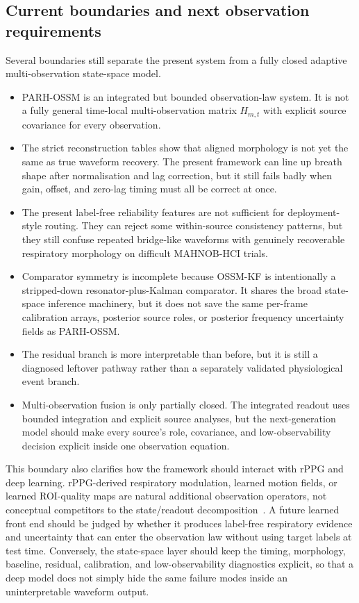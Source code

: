 \documentclass[fleqn,10pt]{wlscirep}
\begin{document}
\subsection*{Current boundaries and next observation requirements}
Several boundaries still separate the present system from a fully
closed adaptive multi-observation state-space model.
\begin{itemize}[nosep]
\item PARH-OSSM is an integrated but bounded observation-law system. It is
not a fully general time-local multi-observation matrix $H_{m,t}$ with explicit
source covariance for every observation.
\item The strict reconstruction tables show that aligned morphology is not
yet the same as true waveform recovery. The present framework can line up breath
shape after normalisation and lag correction, but it still fails badly when
gain, offset, and zero-lag timing must all be correct at once.
\item The present label-free reliability features are not sufficient for
deployment-style routing. They can reject some within-source consistency
patterns, but they still confuse repeated bridge-like waveforms with genuinely
recoverable respiratory morphology on difficult MAHNOB-HCI trials.
\item Comparator symmetry is incomplete because OSSM-KF is intentionally a
stripped-down resonator-plus-Kalman comparator. It shares the broad
state-space inference machinery, but it does not save the same per-frame
calibration arrays, posterior source roles, or posterior frequency uncertainty
fields as PARH-OSSM.
\item The residual branch is more interpretable than before, but it is still a
diagnosed leftover pathway rather than a separately validated physiological
event branch.
\item Multi-observation fusion is only partially closed. The integrated readout uses
bounded integration and explicit source analyses, but the next-generation model
should make every source's role, covariance, and low-observability decision
explicit inside one observation equation.
\end{itemize}

This boundary also clarifies how the framework should interact with rPPG and
deep learning. rPPG-derived respiratory modulation, learned motion fields, or
learned ROI-quality maps are natural additional observation operators, not
conceptual competitors to the state/readout decomposition~\cite{Gwak2024MultimodalBreathing,Du2021WeaklySupervisedRPPGRespiration}.
A future learned front end should be judged by whether it produces label-free
respiratory evidence and uncertainty that can enter the observation law without
using target labels at test time. Conversely, the state-space layer should keep
the timing, morphology, baseline, residual, calibration, and low-observability
diagnostics explicit, so that a deep model does not simply hide the same
failure modes inside an uninterpretable waveform output.
\end{document}
